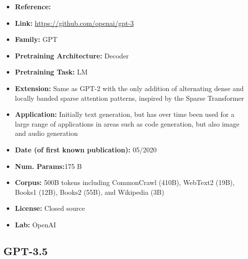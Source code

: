 \documentclass{article}
\begin{document}
            \begin{itemize}
                 \item \textbf{Reference:} 
                 \item \textbf{Link:} \url{https://github.com/openai/gpt-3}
                 \item \textbf{Family:} GPT 
                \item \textbf{Pretraining Architecture:} Decoder
                \item \textbf{Pretraining Task:} LM
                \item \textbf{Extension:} Same as GPT-2 with the only addition of alternating dense and locally banded sparse attention patterns, inspired by the Sparse Transformer
                \item \textbf{Application:} Initially text generation, but has over time been used for a large range of applications in areas such as code generation, but also image and audio generation
                \item \textbf{Date (of first known publication):} 05/2020
                \item \textbf{Num. Params:}175 B
                \item \textbf{Corpus:} 500B tokens including CommonCrawl (410B), WebText2 (19B), Books1 (12B), Books2 (55B), and Wikipedia (3B)
                \item \textbf{License:} Closed source
                \item \textbf{Lab:} OpenAI
            \end{itemize}

\subsection{GPT-3.5}
\end{document}
